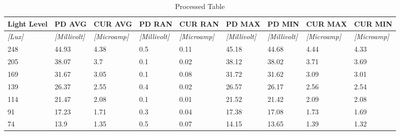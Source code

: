 \documentclass{article}
\begin{document}
\begin{table}[!ht]
\centering
\caption{Processed Table}
\label{my-label}
\begin{tabular}{|l|l|l|l|l|l|l|l|l|}
\hline
\textbf{Light Level} & \textbf{PD AVG}          & \textbf{CUR AVG}        & \textbf{PD RAN}          & \textbf{CUR RAN}        & \textbf{PD MAX}          & \textbf{PD MIN}          & \textbf{CUR MAX}        & \textbf{CUR MIN}        \\ \hline
\textit{{[}Lux{]}}   & \textit{{[}Millivolt{]}} & \textit{{[}Microamp{]}} & \textit{{[}Millivolt{]}} & \textit{{[}Microamp{]}} & \textit{{[}Millivolt{]}} & \textit{{[}Millivolt{]}} & \textit{{[}Microamp{]}} & \textit{{[}Microamp{]}} \\ \hline
248                  & 44.93                    & 4.38                    & 0.5                      & 0.11                    & 45.18                    & 44.68                    & 4.44                    & 4.33                    \\ \hline
205                  & 38.07                    & 3.7                     & 0.1                      & 0.02                    & 38.12                    & 38.02                    & 3.71                    & 3.69                    \\ \hline
169                  & 31.67                    & 3.05                    & 0.1                      & 0.08                    & 31.72                    & 31.62                    & 3.09                    & 3.01                    \\ \hline
139                  & 26.37                    & 2.55                    & 0.4                      & 0.02                    & 26.57                    & 26.17                    & 2.56                    & 2.54                    \\ \hline
114                  & 21.47                    & 2.08                    & 0.1                      & 0.01                    & 21.52                    & 21.42                    & 2.09                    & 2.08                    \\ \hline
91                   & 17.23                    & 1.71                    & 0.3                      & 0.04                    & 17.38                    & 17.08                    & 1.73                    & 1.69                    \\ \hline
74                   & 13.9                     & 1.35                    & 0.5                      & 0.07                    & 14.15                    & 13.65                    & 1.39                    & 1.32                    \\ \hline

\end{tabular}
\end{table}
\end{document}
